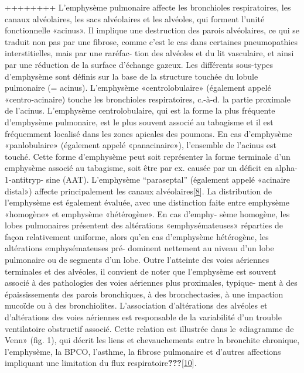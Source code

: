 \documentclass[12pt,]{article}
\begin{document}
++++++++ L'emphysème pulmonaire affecte les bronchioles respiratoires,
les canaux alvéolaires, les sacs alvéolaires et les alvéoles, qui
forment l'unité fonctionnelle «acinus». Il implique une destruction des
parois alvéolaires, ce qui se traduit non pas par une fibrose, comme
c'est le cas dans certaines pneumopathies interstitielles, mais par une
raréfac- tion des alvéoles et du lit vasculaire, et ainsi par une
réduction de la surface d'échange gazeux. Les différents sous-types
d'emphysème sont définis sur la base de la structure touchée du lobule
pulmonaire (= acinus). L'emphysème «centrolobulaire» (également appelé
«centro-acinaire) touche les bronchioles respiratoires, c.-à-d. la
partie proximale de l'acinus. L'emphysème centrolobulaire, qui est la
forme la plus fréquente d'emphysème pulmonaire, est le plus souvent
associé au tabagisme et il est fréquemment localisé dans les zones
apicales des poumons. En cas d'emphysème «panlobulaire» (également
appelé «panacinaire»), l'ensemble de l'acinus est touché. Cette forme
d'emphysème peut soit représenter la forme terminale d'un emphysème
associé au tabagisme, soit être par ex. causée par un déficit en
alpha-1-antitryp- sine (AAT). L'emphysème ``paraseptal'' (également
appelé «acinaire distal») affecte principalement les canaux
alvéolaires{[}\protect\hyperlink{ref-mcdonough2011small}{8}{]}. La
distribution de l'emphysème est également évaluée, avec une distinction
faite entre emphysème «homogène» et emphysème «hétérogène». En cas
d'emphy- sème homogène, les lobes pulmonaires présentent des altérations
«emphysémateuses» réparties de façon relativement uniforme, alors qu'en
cas d'emphysème hétérogène, les altérations emphysémateuses pré-
dominent nettement au niveau d'un lobe pulmonaire ou de segments d'un
lobe. Outre l'atteinte des voies aériennes terminales et des alvéoles,
il convient de noter que l'emphysème est souvent associé à des
pathologies des voies aériennes plus proximales, typique- ment à des
épaississements des parois bronchiques, à des bronchectasies, à une
impaction mucoïde ou à des bronchiolites. L'association d'altérations
des alvéoles et d'altérations des voies aériennes est responsable de la
variabilité d'un trouble ventilatoire obstructif associé. Cette relation
est illustrée dans le «diagramme de Venn» (fig. 1), qui décrit les liens
et chevauchements entre la bronchite chronique, l'emphysème, la BPCO,
l'asthme, la fibrose pulmonaire et d'autres affections impliquant une
limitation du flux
respiratoire{\textbf{???}}{[}\protect\hyperlink{ref-vogelmeier2017global}{10}{]}.
\end{document}
